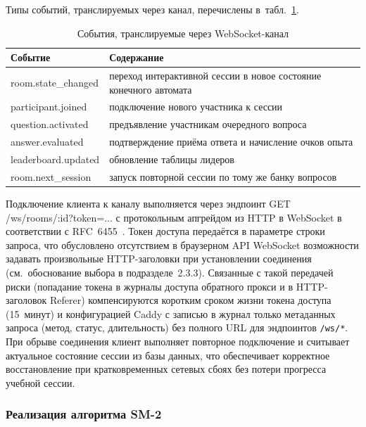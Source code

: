 Типы событий, транслируемых через канал, перечислены
в~табл.~\ref{tab:ws-events}.

\begin{table}[!htb]
\fontsize{11pt}{13pt}\selectfont
\centering
\caption{События, транслируемые через WebSocket-канал}
\label{tab:ws-events}
\smallskip
\begin{tabular}{|l|p{8.5cm}|}
    \hline
    \textbf{Событие} & \textbf{Содержание} \\
    \hline
        room.state\_changed & переход интерактивной сессии в новое состояние конечного автомата \\
    \hline
        participant.joined  & подключение нового участника к сессии \\
    \hline
        question.activated  & предъявление участникам очередного вопроса \\
    \hline
        answer.evaluated    & подтверждение приёма ответа и начисление очков опыта \\
    \hline
        leaderboard.updated & обновление таблицы лидеров \\
    \hline
        room.next\_session  & запуск повторной сессии по тому же банку вопросов \\
    \hline
\end{tabular}
\end{table}
\FloatBarrier

Подключение клиента к каналу выполняется через эндпоинт
GET /ws/rooms/:id?token=... с протокольным апгрейдом
из HTTP в WebSocket в соответствии с RFC~6455~\cite{rfc6455}.
Токен доступа передаётся в параметре строки запроса, что
обусловлено отсутствием в браузерном API WebSocket возможности
задавать произвольные HTTP-заголовки при установлении соединения
(см.~обоснование выбора в подразделе~2.3.3). Связанные с такой
передачей риски (попадание токена в журналы доступа обратного
прокси и в HTTP-заголовок Referer) компенсируются коротким сроком
жизни токена доступа (15~минут) и конфигурацией Caddy с записью
в журнал только метаданных запроса (метод, статус, длительность)
без полного URL для эндпоинтов \texttt{/ws/*}. При обрыве
соединения клиент выполняет повторное подключение и считывает
актуальное состояние сессии из базы данных, что обеспечивает
корректное восстановление при кратковременных сетевых сбоях
без потери прогресса учебной сессии.

\subsubsection{Реализация алгоритма SM-2}

